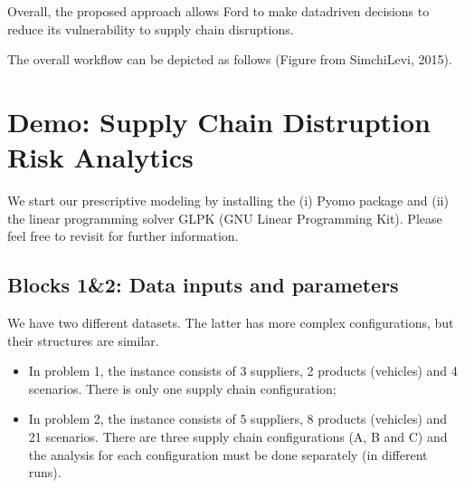 \documentclass[letterpaper,10pt,english]{jupyterBook}
\begin{document}
\sphinxAtStartPar
Overall, the proposed approach allows Ford to make data\sphinxhyphen{}driven decisions to reduce its vulnerability to supply chain disruptions.

\sphinxAtStartPar
The overall workflow can be depicted as follows (Figure from Simchi\sphinxhyphen{}Levi, 2015).



\sphinxstepscope


\section{Demo: Supply Chain Distruption Risk Analytics}
\label{\detokenize{docs/Case3_1_Disruption_Risk_Analytics:demo-supply-chain-distruption-risk-analytics}}\label{\detokenize{docs/Case3_1_Disruption_Risk_Analytics::doc}}
\sphinxAtStartPar
We start our prescriptive modeling by installing the (i) Pyomo package and (ii) the linear programming solver GLPK (GNU Linear Programming Kit). Please feel free to revisit  for further information.

\begin{sphinxVerbatim}[commandchars=\\\{\}]
   
  
\end{sphinxVerbatim}


\subsection{Blocks 1\&2: Data inputs and parameters}
\label{\detokenize{docs/Case3_1_Disruption_Risk_Analytics:blocks-1-2-data-inputs-and-parameters}}
\sphinxAtStartPar
We have two different datasets. The latter has more complex configurations, but their structures are similar.
\begin{itemize}
\item {} 
\sphinxAtStartPar
In problem 1, the instance consists of 3 suppliers, 2 products (vehicles) and 4 scenarios. There is only one supply chain configuration;

\item {} 
\sphinxAtStartPar
In problem 2, the instance consists of 5 suppliers, 8 products (vehicles) and 21 scenarios. There are three supply chain configurations (A, B and C) and the analysis for each configuration must be done separately (in different runs).

\end{itemize}
\end{document}
